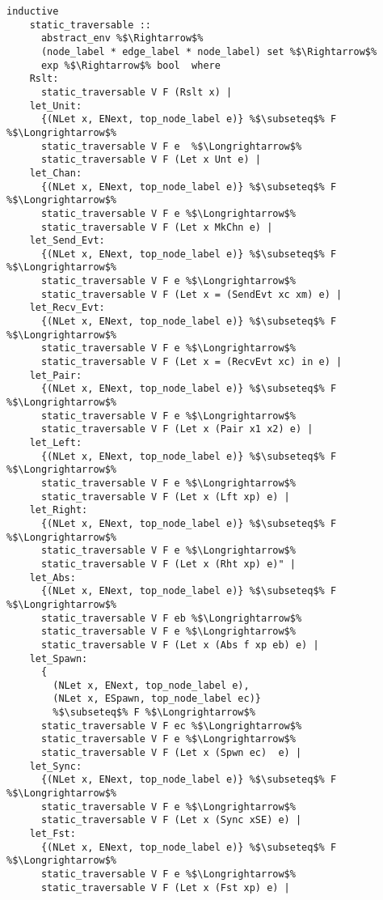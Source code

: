 \documentclass{article}
\begin{document}
\begin{lstlisting}[style=codestyle1, escapechar=\%]
  inductive
    static_traversable ::
      abstract_env %$\Rightarrow$%
      (node_label * edge_label * node_label) set %$\Rightarrow$%
      exp %$\Rightarrow$% bool  where
    Rslt:
      static_traversable V F (Rslt x) |
    let_Unit:
      {(NLet x, ENext, top_node_label e)} %$\subseteq$% F %$\Longrightarrow$%
      static_traversable V F e  %$\Longrightarrow$%
      static_traversable V F (Let x Unt e) |
    let_Chan:
      {(NLet x, ENext, top_node_label e)} %$\subseteq$% F %$\Longrightarrow$%
      static_traversable V F e %$\Longrightarrow$%
      static_traversable V F (Let x MkChn e) |
    let_Send_Evt:
      {(NLet x, ENext, top_node_label e)} %$\subseteq$% F %$\Longrightarrow$%
      static_traversable V F e %$\Longrightarrow$%
      static_traversable V F (Let x = (SendEvt xc xm) e) |
    let_Recv_Evt:
      {(NLet x, ENext, top_node_label e)} %$\subseteq$% F %$\Longrightarrow$%
      static_traversable V F e %$\Longrightarrow$%
      static_traversable V F (Let x = (RecvEvt xc) in e) |
    let_Pair:
      {(NLet x, ENext, top_node_label e)} %$\subseteq$% F %$\Longrightarrow$%
      static_traversable V F e %$\Longrightarrow$%
      static_traversable V F (Let x (Pair x1 x2) e) |
    let_Left:
      {(NLet x, ENext, top_node_label e)} %$\subseteq$% F %$\Longrightarrow$%
      static_traversable V F e %$\Longrightarrow$%
      static_traversable V F (Let x (Lft xp) e) |
    let_Right:
      {(NLet x, ENext, top_node_label e)} %$\subseteq$% F %$\Longrightarrow$%
      static_traversable V F e %$\Longrightarrow$%
      static_traversable V F (Let x (Rht xp) e)" |
    let_Abs:
      {(NLet x, ENext, top_node_label e)} %$\subseteq$% F %$\Longrightarrow$%
      static_traversable V F eb %$\Longrightarrow$%
      static_traversable V F e %$\Longrightarrow$%
      static_traversable V F (Let x (Abs f xp eb) e) |
    let_Spawn:
      {
        (NLet x, ENext, top_node_label e),
        (NLet x, ESpawn, top_node_label ec)}
        %$\subseteq$% F %$\Longrightarrow$%
      static_traversable V F ec %$\Longrightarrow$%
      static_traversable V F e %$\Longrightarrow$%
      static_traversable V F (Let x (Spwn ec)  e) |
    let_Sync:
      {(NLet x, ENext, top_node_label e)} %$\subseteq$% F %$\Longrightarrow$%
      static_traversable V F e %$\Longrightarrow$%
      static_traversable V F (Let x (Sync xSE) e) |
    let_Fst:
      {(NLet x, ENext, top_node_label e)} %$\subseteq$% F %$\Longrightarrow$%
      static_traversable V F e %$\Longrightarrow$%
      static_traversable V F (Let x (Fst xp) e) |

\end{lstlisting}
\end{document}
